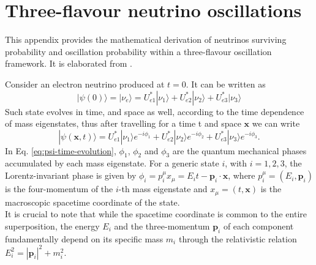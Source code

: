 \chapter{Three-flavour neutrino oscillations}
\label{app:ThreeFlavoursOscillation}
This appendix provides the mathematical derivation of neutrinos surviving probability and oscillation probability within a three-flavour oscillation framework. It is elaborated from \cite{Brugnera}.

Consider an electron neutrino produced at $t=0$. It can be written as 
\begin{equation*}
    | \psi(0) \rangle = | \nu_e \rangle = U_{e1}^* | \nu_1 \rangle + U_{e2}^* | \nu_2 \rangle + U_{e3}^* | \nu_3 \rangle
\end{equation*}
Such state evolves in time, and space as well, according to the time dependence of mass eigenstates, thus after travelling for a time t and space $\mathbf{x}$
we can write
\begin{equation}
    \label{eq:psi-time-evolution}
    | \psi(\mathbf{x}, t) \rangle = U_{e1}^* | \nu_1 \rangle e^{-i\phi_1} + U_{e2}^* | \nu_2 \rangle e^{-i\phi_2} + U_{e3}^* | \nu_3 \rangle e^{-i\phi_3}.
\end{equation}
In  Eq. \ref{eq:psi-time-evolution}, $\phi_1$, $\phi_2$ and $\phi_3$ are the quantum mechanical phases accumulated by each mass eigenstate.
For a generic state $i$, with $i = 1, 2, 3$, the Lorentz-invariant phase is given by $\phi_i = p^\mu_i x_\mu = E_i t - \mathbf{p}_i \cdot \mathbf{x}$, where $p^\mu_i = (E_i, \mathbf{p}_i)$
is the four-momentum of the $i$-th mass eigenstate and $x_\mu = (t, \mathbf{x})$ is the macroscopic spacetime coordinate of the state.\\
It is crucial to note that while the spacetime coordinate is common to the entire superposition, 
the energy $E_i$ and the three-momentum $\mathbf{p}_i$ of each component fundamentally depend on its specific mass $m_i$ through the relativistic 
relation $E_i^2 = |\mathbf{p}_i|^2 + m_i^2$.

